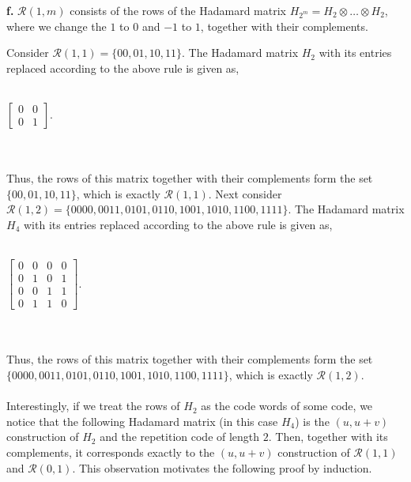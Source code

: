 \documentclass[12pt]{article}
\begin{document}
\begin{adjustwidth}{0.5cm}{}
\textbf{f.} $\mathcal{R}(1, m)$ consists of the rows of the Hadamard matrix $H_{2^m} = H_2 \otimes \dots \otimes H_2$, where we change the $1$ to $0$ and $-1$ to $1$, together with their complements.\\
	\begin{adjustwidth}{0.5cm}{}
	Consider $\mathcal{R}(1, 1) = \{00, 01, 10, 11\}$.  The Hadamard matrix $H_{2}$ with its entries replaced according to the above rule is given as,\\\\
	\centerline{$
		\begin{bmatrix}
			0 & 0\\
			0 & 1
		\end{bmatrix}
	$.}\\\\
	Thus, the rows of this matrix together with their complements form the set $\{00, 01, 10, 11\}$, which is exactly $\mathcal{R}(1, 1)$.  Next consider $\mathcal{R}(1, 2) = \{0000, 0011, 0101, 0110, 1001, 1010, 1100, 1111\}$.  The Hadamard matrix $H_{4}$ with its entries replaced according to the above rule is given as,\\\\
	\centerline{$
		\begin{bmatrix}
			0 & 0 & 0 & 0\\
			0 & 1 & 0 & 1\\
			0 & 0 & 1 & 1\\
			0 & 1 & 1 & 0
		\end{bmatrix}
	$.}\\\\
	Thus, the rows of this matrix together with their complements form the set $\{0000, 0011, 0101, 0110, 1001, 1010, 1100, 1111\}$, which is exactly $\mathcal{R}(1, 2)$.\\\\
	Interestingly, if we treat the rows of $H_2$ as the code words of some code, we notice that the following Hadamard matrix (in this case $H_4$) is the $(u, u+v)$ construction of $H_2$ and the repetition code of length $2$.  Then, together with its complements, it corresponds exactly to the $(u, u+v)$ construction of $\mathcal{R}(1, 1)$ and $\mathcal{R}(0, 1)$.  This observation motivates the following proof by induction.\\\\

\end{adjustwidth}
\end{adjustwidth}
\end{document}
